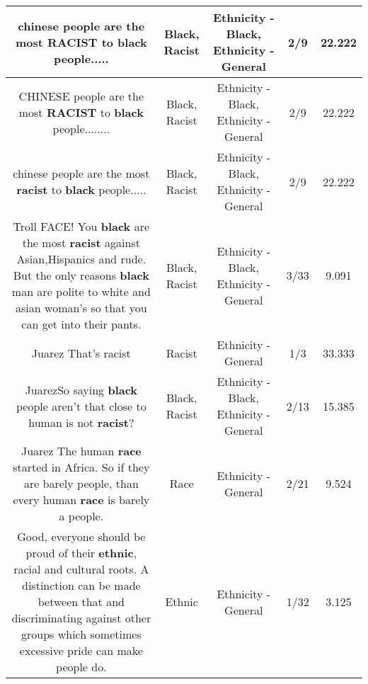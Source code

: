 \documentclass[11pt]{article}
\newlength\mylength
\begin{document}
\begin{center}
\begin{longtable}{|C{.65\mylength}|C{.30\mylength}|C{.12\mylength}|C{.12\mylength}|C{.12\mylength}|}
  \small chinese people are the most \textbf{RACIST} to \textbf{black} people.....\normalsize   & Black, Racist & Ethnicity - Black, Ethnicity - General & 2/9 & 22.222 \\  \hline
  \small CHINESE people are the most \textbf{RACIST} to \textbf{black} people........\normalsize   & Black, Racist & Ethnicity - Black, Ethnicity - General & 2/9 & 22.222 \\  \hline
  \small chinese people are the most \textbf{racist} to \textbf{black} people.....\normalsize   & Black, Racist & Ethnicity - Black, Ethnicity - General & 2/9 & 22.222 \\  \hline
  \small Troll FACE! You \textbf{black} are the most \textbf{racist} against Asian,Hispanics  and rude. But the only reasons \textbf{black} man are polite to white and asian woman's so that you can get into their pants.\normalsize   & Black, Racist & Ethnicity - Black, Ethnicity - General & 3/33 & 9.091 \\  \hline
  \small Juarez That's racist\normalsize   & Racist & Ethnicity - General & 1/3 & 33.333 \\  \hline
  \small JuarezSo saying \textbf{black} people aren't that close to human is not \textbf{racist}?\normalsize   & Black, Racist & Ethnicity - Black, Ethnicity - General & 2/13 & 15.385 \\  \hline
  \small Juarez The human \textbf{race} started in Africa. So if they are barely people, than every human \textbf{race} is barely a people.\normalsize   & Race & Ethnicity - General & 2/21 & 9.524 \\  \hline
  \small Good, everyone should be proud of their \textbf{ethnic}, racial and cultural roots. A distinction can be made between that and discriminating against other groups which sometimes excessive pride can make people do.\normalsize   & Ethnic & Ethnicity - General & 1/32 & 3.125 \\  \hline

\end{longtable}
\end{center}
\end{document}
